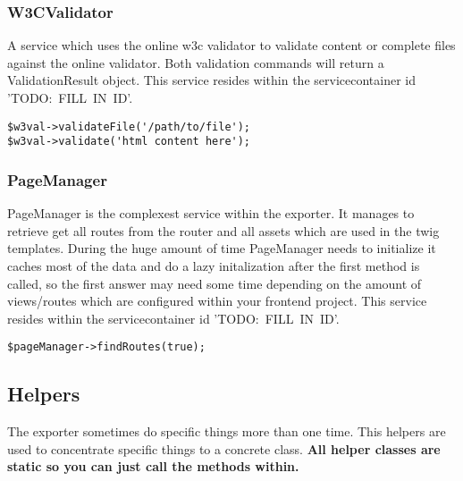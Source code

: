 \noindent
\begin{minipage}{\textwidth}
\vspace{1.5em}
\subsubsection{W3CValidator}
A service which uses the online w3c validator to validate content or complete files against the online validator. Both validation commands will return a ValidationResult object. This service resides within the servicecontainer id \mbox{'TODO: FILL IN ID'}.

\begin{verbatim}
$w3val->validateFile('/path/to/file');
$w3val->validate('html content here');
\end{verbatim}
\end{minipage}

\noindent
\begin{minipage}{\textwidth}
\vspace{1.5em}
\subsubsection{PageManager}
PageManager is the complexest service within the exporter. It manages to retrieve get all routes from the router and all assets which are used in the twig templates. During the huge amount of time PageManager needs to initialize it caches most of the data and do a lazy initalization after the first method is called, so the first answer may need some time depending on the amount of views/routes which are configured within your frontend project. This service resides within the servicecontainer id \mbox{'TODO: FILL IN ID'}.

\begin{verbatim}
$pageManager->findRoutes(true);
\end{verbatim}
\end{minipage}

\noindent
\begin{minipage}{\textwidth}
\vspace{1.5em}
\subsection{Helpers}
The exporter sometimes do specific things more than one time. This helpers are used to concentrate specific things to a concrete class. \textbf{All helper classes are static so you can just call the methods within.}
\end{minipage}

